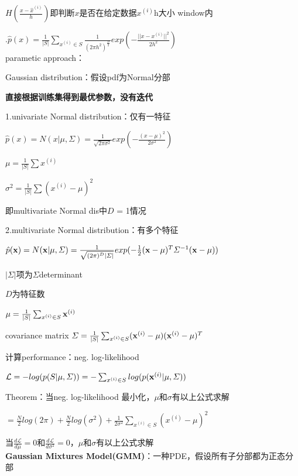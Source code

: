 \documentclass[UTF8]{ctexart}
\begin{document}
  \quad \quad \quad $H(\frac{x - \hat{x}^{(i)}}{h})$即判断$x$是否在给定数据$x^{(i)}$h大小 window内

  \quad {}.$\hat{p}(x) = \frac{1}{|S|}\sum_{x^{(i)} \in S}\frac{1}{(2 \pi h^2)^{\frac{D}{2}}}exp(-\frac{||x - x^{(i)}||^2}{2h^2})$\\

  parametic approach：

  \quad Gaussian distribution：假设pdf为Normal分部

  \quad \quad \textbf{直接根据训练集得到最优参数，没有迭代}

  \quad \quad 1.univariate Normal distribution：仅有一特征
  
  \quad \quad \quad $\hat{p}(x) = N(x|\mu, \varSigma) = \frac{1}{\sqrt{2\pi \sigma^2}}exp(-\frac{(x - \mu)^2}{2\sigma^2})$

  \quad \quad \quad \quad $\mu = \frac{1}{|S|}\sum x^{(i)}$

  \quad \quad \quad \quad $\sigma^2 = \frac{1}{|S|}\sum(x^{(i)} - \mu)^2$

  \quad \quad \quad \quad 即multivariate Normal dis中$D$ = 1情况

  \quad \quad 2.multivariate Normal distribution：有多个特征
  
  \quad \quad \quad $\hat{p}({\bf x}) = N({\bf x}|\mu, \varSigma) = \frac{1}{\sqrt{(2\pi)^D|\varSigma|}}exp(-\frac{1}{2}({\bf x}-\mu)^T\varSigma^{-1}({\bf x}-\mu))$

  \quad \quad \quad \quad $|\varSigma|$项为$\varSigma$determinant

  \quad \quad \quad \quad $D$为特征数

  \quad \quad \quad \quad $\mu = \frac{1}{|S|}\sum_{x^{(i)} \in S}{\bf x}^{(i)}$

  \quad \quad \quad \quad covariance matrix $\varSigma = \frac{1}{|S|}\sum_{x^{(i)} \in S}({\bf x}^{(i)} - \mu)({\bf x}^{(i)} - \mu)^T$

  \quad \quad 计算performance：neg. log-likelihood

  \quad \quad \quad $\mathcal{L} = -log(p(S | \mu, \varSigma)) = -\sum_{x^{(i)} \in S} log(p({\bf x}^{(i)}|\mu, \varSigma))$

  \quad \quad Theorem：当neg. log-likelihood 最小化，$\mu$和$\sigma$有以上公式求解

  \quad \quad \quad \quad $= \frac{N}{2}log(2\pi) + \frac{N}{2}log(\sigma^2) + \frac{1}{2\sigma^2}\sum_{x^{(i)} \in S}(x^{(i)} - \mu)^2$

  \quad \quad \quad 当$\frac{d\mathcal{L}}{d\mu} = 0$和$\frac{d\mathcal{L}}{d\sigma^2} = 0$，$\mu$和$\sigma$有以上公式求解\\
\textbf{Gaussian Mixtures Model(GMM)}：一种PDE，假设所有子分部都为正态分部
\end{document}
